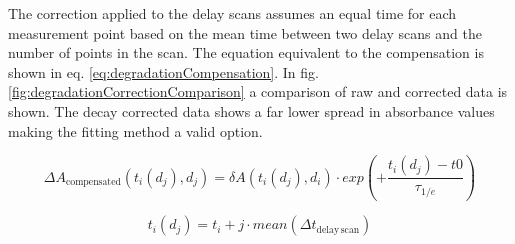 \documentclass[twoside,openright,listof=numbered]{scrreprt}
\begin{document}
The correction applied to the delay scans assumes an equal time for each measurement point based on the mean time between two delay scans and the number of points in the scan. The equation equivalent to the compensation is shown in eq. \ref{eq:degradationCompensation}. In fig. \ref{fig:degradationCorrectionComparison} a comparison of raw and corrected data is shown. The decay corrected data shows a far lower spread in absorbance values making the fitting method a valid option. 

\begin{equation}\label{eq:degradationCompensation}
\Delta A_\text{compensated}(t_i(d_j), d_j) = \delta A(t_i(d_j), d_i)\cdot exp\left(+\frac{t_i(d_j)-t0}{\tau_{1/e}}\right)
\end{equation}

\begin{equation*}
t_i(d_j) = t_i + j\cdot mean(\Delta t_\mathrm{delay\, scan})
\end{equation*}
\end{document}
